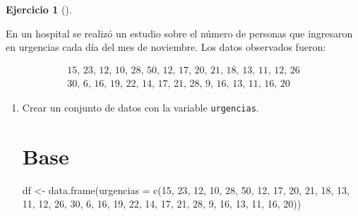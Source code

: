 \documentclass[
  a4paper,
]{scrreport}
\newenvironment{Shaded}{\begin{snugshade}}{\end{snugshade}}
\newcommand{\AttributeTok}[1]{\textcolor[rgb]{0.40,0.45,0.13}{#1}}
\newcommand{\DecValTok}[1]{\textcolor[rgb]{0.68,0.00,0.00}{#1}}
\newcommand{\FunctionTok}[1]{\textcolor[rgb]{0.28,0.35,0.67}{#1}}
\newcommand{\NormalTok}[1]{\textcolor[rgb]{0.00,0.23,0.31}{#1}}
\newcommand{\OtherTok}[1]{\textcolor[rgb]{0.00,0.23,0.31}{#1}}
\theoremstyle{definition}
\newtheorem{exercise}{Ejercicio}[chapter]
\theoremstyle{remark}
\begin{document}
\begin{exercise}[]\protect\hypertarget{exr-frecuencias-graficos-urgencias}{}\label{exr-frecuencias-graficos-urgencias}

En un hospital se realizó un estudio sobre el número de personas que
ingresaron en urgencias cada día del mes de noviembre. Los datos
observados fueron:

\[
\begin{array}{c}
\mbox{15, 23, 12, 10, 28, 50, 12, 17, 20, 21, 18, 13, 11, 12, 26} \\
\mbox{30, 6, 16, 19, 22, 14, 17, 21, 28, 9, 16, 13, 11, 16, 20}
\end{array}
\]

\begin{enumerate}
\def\labelenumi{\alph{enumi}.}
\item
  Crear un conjunto de datos con la variable \texttt{urgencias}.

  \begin{tcolorbox}[enhanced jigsaw, colframe=quarto-callout-tip-color-frame, toprule=.15mm, bottomtitle=1mm, breakable, opacitybacktitle=0.6, toptitle=1mm, colback=white, bottomrule=.15mm, title=\textcolor{quarto-callout-tip-color}{\faLightbulb}\hspace{0.5em}{Solución}, arc=.35mm, left=2mm, titlerule=0mm, rightrule=.15mm, coltitle=black, leftrule=.75mm, opacityback=0, colbacktitle=quarto-callout-tip-color!10!white]

  \section{Base}

\begin{Shaded}
\begin{Highlighting}[]
\NormalTok{df }\OtherTok{\textless{}{-}} \FunctionTok{data.frame}\NormalTok{(}\AttributeTok{urgencias =} \FunctionTok{c}\NormalTok{(}\DecValTok{15}\NormalTok{, }\DecValTok{23}\NormalTok{, }\DecValTok{12}\NormalTok{, }\DecValTok{10}\NormalTok{, }\DecValTok{28}\NormalTok{, }\DecValTok{50}\NormalTok{, }\DecValTok{12}\NormalTok{, }\DecValTok{17}\NormalTok{, }\DecValTok{20}\NormalTok{, }\DecValTok{21}\NormalTok{, }\DecValTok{18}\NormalTok{, }\DecValTok{13}\NormalTok{, }\DecValTok{11}\NormalTok{, }\DecValTok{12}\NormalTok{, }\DecValTok{26}\NormalTok{, }\DecValTok{30}\NormalTok{, }\DecValTok{6}\NormalTok{, }\DecValTok{16}\NormalTok{, }\DecValTok{19}\NormalTok{, }\DecValTok{22}\NormalTok{, }\DecValTok{14}\NormalTok{, }\DecValTok{17}\NormalTok{, }\DecValTok{21}\NormalTok{, }\DecValTok{28}\NormalTok{, }\DecValTok{9}\NormalTok{, }\DecValTok{16}\NormalTok{, }\DecValTok{13}\NormalTok{, }\DecValTok{11}\NormalTok{, }\DecValTok{16}\NormalTok{, }\DecValTok{20}\NormalTok{))}
\end{Highlighting}
\end{Shaded}


\end{tcolorbox}
\end{enumerate}
\end{exercise}
\end{document}
